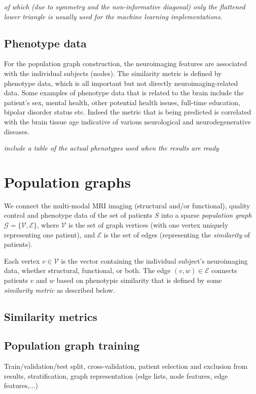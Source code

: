 \textit{of which (due to symmetry and the non-informative diagonal) only the flattened lower triangle is usually used for the machine learning implementations.}

\subsection{Phenotype data}
For the population graph construction, the neuroimaging features are associated with the individual subjects (nodes). The similarity metric is defined by phenotype data, which is all important but not directly neuroimaging-related data. Some examples of phenotype data that is related to the brain include the patient's sex, mental health, other potential health issues, full-time education, bipolar disorder status etc. Indeed the metric that is being predicted is correlated with the brain tissue age indicative of various neurological and neurodegenerative diseases.

\textit{include a table of the actual phenotypes used when the results are ready}

\section{Population graphs}
We connect the multi-modal MRI imaging (structural and/or functional), quality control and phenotype data of the set of patients $S$ into a sparse \textit{population graph} $\mathcal{G} = \{\mathcal{V}, \mathcal{E}\}$, where $\mathcal{V}$ is the set of graph vertices (with one vertex uniquely representing one patient), and $\mathcal{E}$ is the set of edges (representing the \textit{similarity} of patients).

Each vertex $v \in \mathcal{V}$ is the vector containing the individual subject's neuroimaging data, whether structural, functional, or both. The edge $(v, w) \in \mathcal{E}$ connects patients $v$ and $w$ based on phenotypic similarity that is defined by some \textit{similarity metric} as described below.

\subsection{Similarity metrics}


\subsection{Population graph training}
Train/validation/test split, cross-validation, patient selection and exclusion from results, stratification, graph representation (edge lists, node features, edge features,...)

